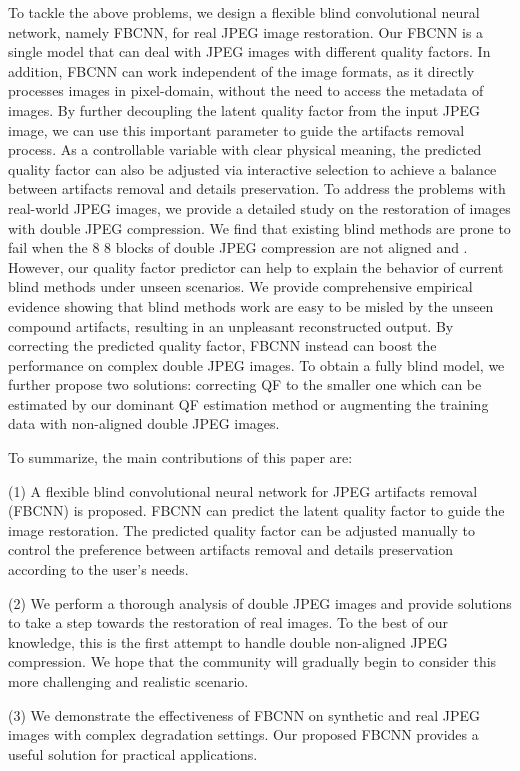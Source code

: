 \documentclass[10pt,twocolumn,letterpaper]{article}
\begin{document}
To tackle the above problems, we design a flexible blind convolutional neural network, namely FBCNN, for real JPEG image restoration. Our FBCNN is a single model that can deal with JPEG images with different quality factors. In addition, FBCNN can work independent of the image formats, as it directly processes images in pixel-domain, without the need to access the metadata of images. By further decoupling the latent quality factor from the input JPEG image, we can use this important parameter to guide the artifacts removal process. As a controllable variable with clear physical meaning, the predicted quality factor can also be adjusted via interactive selection to achieve a balance between artifacts removal and details preservation. To address the problems with real-world JPEG images, we provide a detailed study on the restoration of images with double JPEG compression. We find that existing blind methods are prone to fail when the 8  8 blocks of double JPEG compression are not aligned and   . However, our quality factor predictor can help to explain the behavior of current blind methods under unseen scenarios. We provide comprehensive empirical evidence showing that blind methods work are easy to be misled by the unseen compound artifacts, resulting in an unpleasant reconstructed output. By correcting the predicted quality factor, FBCNN instead can boost the performance on complex double JPEG images. To obtain a fully blind model, we further propose two solutions: correcting QF to the smaller one which can be estimated by our dominant QF estimation method or augmenting the training data with non-aligned double JPEG images.

To summarize, the main contributions of this paper are: 

(1) A flexible blind convolutional neural network for JPEG artifacts removal (FBCNN) is proposed. FBCNN can predict the latent quality factor to guide the image restoration. The predicted quality factor can be adjusted manually to control the preference between artifacts removal and details preservation according to the user's needs.

(2) We perform a thorough analysis of double JPEG images and provide solutions to take a step towards the restoration of real images. To the best of our knowledge, this is the first attempt to handle double non-aligned JPEG compression. We hope that the community will gradually begin to consider this more challenging and realistic scenario.

(3) We demonstrate the effectiveness of FBCNN on synthetic and real JPEG images with complex degradation settings. Our proposed FBCNN provides a useful solution for practical applications.
\end{document}
